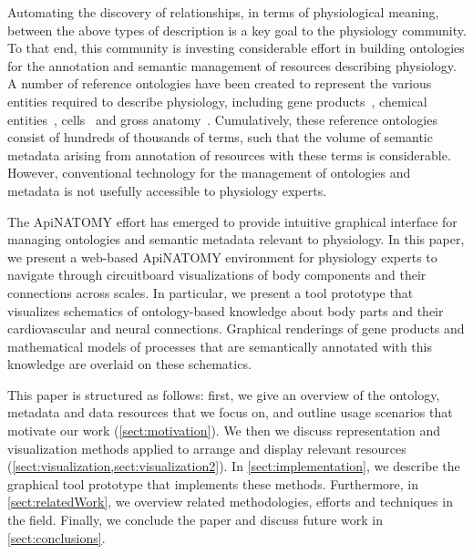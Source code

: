 Automating the discovery of relationships, in terms of physiological meaning, between the above types of description is a key goal to the physiology community. To that end, this community is investing considerable effort in building ontologies for the annotation and semantic management of resources describing physiology. A number of reference ontologies have been created to represent the various entities required to describe physiology, including gene products~\cite{Bla+13}, chemical entities~\cite{HMD+13}, cells~\cite{BRA05} and gross anatomy~\cite{RM03}. Cumulatively, these reference ontologies consist of hundreds of thousands of terms, such that the volume of semantic metadata arising from annotation of resources with these terms is considerable. However, conventional technology for the management of ontologies and metadata is not usefully accessible to physiology experts.

The ApiNATOMY effort has emerged to provide intuitive graphical interface for managing ontologies and semantic metadata relevant to physiology. In this paper, we present a web-based ApiNATOMY environment for physiology experts to navigate through circuitboard visualizations of body components and their connections across scales. In particular, we present a tool prototype that visualizes schematics of ontology-based knowledge about body parts and their cardiovascular and neural connections. Graphical renderings of gene products and mathematical models of processes that are semantically annotated with this knowledge are overlaid on these schematics.

This paper is structured as follows: first, we give an overview of the ontology, metadata and data resources that we focus on, and outline usage scenarios that motivate our work (\cref{sect:motivation}).  We then we discuss representation and visualization methods applied to arrange and display relevant resources (\cref{sect:visualization,sect:visualization2}). In \cref{sect:implementation}, we describe the graphical tool prototype that implements these methods. Furthermore, in \cref{sect:relatedWork}, we overview related methodologies, efforts and techniques in the field. Finally, we conclude the paper and discuss future work in \cref{sect:conclusions}.

